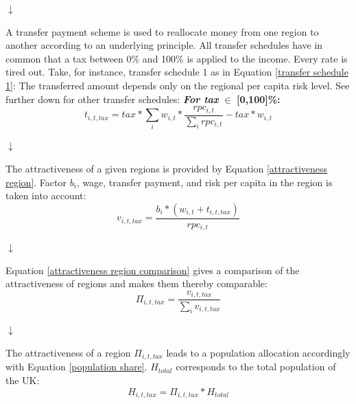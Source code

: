 \documentclass[10pt,a4paper]{article}
\begin{document}
\begin{center}
\begin{center}
    $\downarrow$
\end{center}
A transfer payment scheme is used to reallocate money from one region to another according to an underlying principle. All transfer schedules have in common that a tax between 0\% and 100\% is applied to the income. Every rate is tired out. Take, for instance, transfer schedule 1 as in Equation \ref{transfer schedule 1}: The transferred amount depends only on the regional per capita risk level. See further down for other transfer schedules:
\newline
\newline
\textbf{\textit{For tax }}$\in$ \textbf{[0,100]\%:}\vspace{.5cm}
\begin{equation}
    t_{i,t,tax} = tax * \sum_i w_{i,t} * \frac{rpc_{i,t}}{\sum_i rpc_{i,t}} - tax * w_{i,t}
    \label{transfer schedule 1}
\end{equation}

\begin{center}
    $\downarrow$
\end{center}
The attractiveness of a given regions is provided by Equation \ref{attractiveness region}. Factor $b_i$, wage, transfer payment, and risk per capita in the region is taken into account: 
\begin{equation}
    v_{i,t,tax} = \frac{b_i*(w_{i,t}+t_{i,t,tax})}{rpc_{i,t}}
    \label{attractiveness region}
\end{equation}

\begin{center}
    $\downarrow$
\end{center}
Equation \ref{attractiveness region comparison} gives a comparison of the attractiveness of regions and makes them thereby comparable:
\begin{equation}
    \Pi_{i,t,tax} = \frac{v_{i,t,tax}}{\sum_i v_{i,t,tax}}
    \label{attractiveness region comparison}
\end{equation}

\begin{center}
    $\downarrow$
\end{center}
The attractiveness of a region $\Pi_{i,t,tax}$ leads to a population allocation accordingly with Equation \ref{population share}. $H_{total}$ corresponds to the total population of the UK:
\begin{equation}
    H_{i,t,tax} = \Pi_{i,t,tax} * H_{total}
    \label{population share}
\end{equation}


\end{center}
\end{document}
